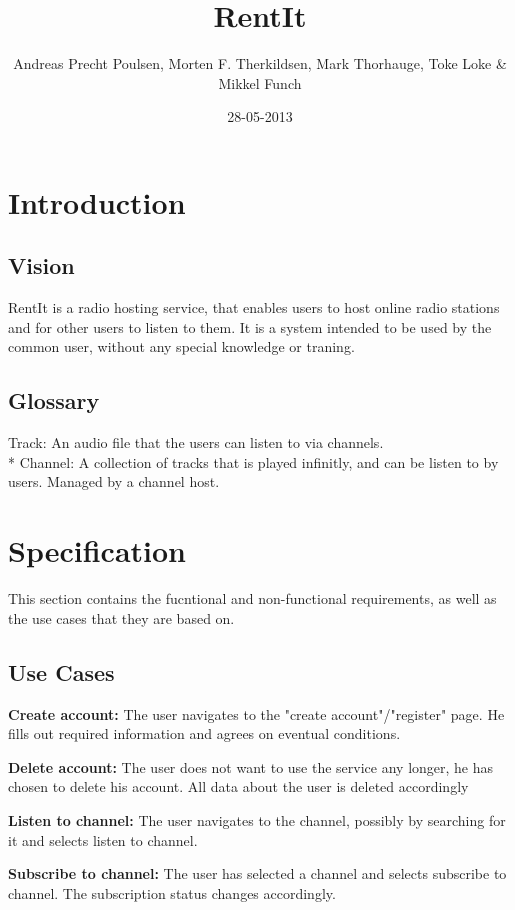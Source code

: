\documentclass[a4paper,11pt,report]{article}
\begin{document}
\title{RentIt}
\author{Andreas Precht Poulsen, Morten F. Therkildsen, Mark Thorhauge, Toke Loke \& Mikkel Funch}
\date{28-05-2013}
\maketitle

\section{Introduction}
\subsection{Vision}
RentIt is a radio hosting service, that enables users to host online radio stations and for other users to listen to them.
It is a system intended to be used by the common user, without any special knowledge or traning.
\subsection{Glossary}
Track: An audio file that the users can listen to via channels. \\*
Channel: A collection of tracks that is played infinitly, and can be listen to by users. Managed by a channel host.

\section{Specification}
This section contains the fucntional and non-functional requirements, as well as the use cases that they are based on.
\subsection{Use Cases}
\textbf{Create account:}
The user navigates to the "create account"/"register" page. He fills out required information and agrees on eventual conditions.

\textbf{Delete account:}
The user does not want to use the service any longer, he has chosen to delete his account. All data about the user is deleted accordingly

\textbf{Listen to channel:}
The user navigates to the channel, possibly by searching for it and selects listen to channel.

\textbf{Subscribe to channel:}
The user has selected a channel and selects subscribe to channel. The subscription status changes accordingly.
\end{document}

